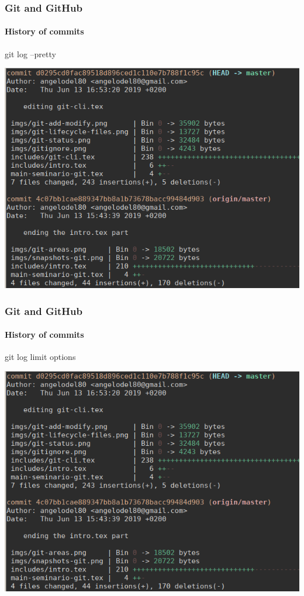 \begin{frame}
	\frametitle{Git and GitHub}
    \framesubtitle{History of commits}
    \addtocounter{nframe}{1}

	\begin{block}{git log --pretty}
		\begin{center}
			\includegraphics[width=.9\textwidth]{imgs/git-log-stats.png}
		\end{center}
	\end{block}

\end{frame}

\begin{frame}
	\frametitle{Git and GitHub}
    \framesubtitle{History of commits}
    \addtocounter{nframe}{1}

	\begin{block}{git log limit options}
		\begin{center}
			\includegraphics[width=.9\textwidth]{imgs/git-log-stats.png}
		\end{center}
	\end{block}

\end{frame}

